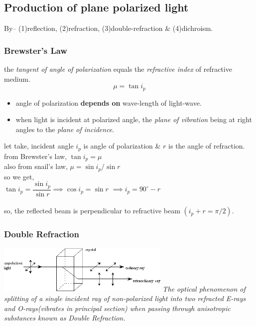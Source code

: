 \documentclass[legalpaper,10pt]{article}
\begin{document}
\begin{multicols*}{2}
	\subsection*{Production of plane polarized light}
	By-- (1)reflection, (2)refraction, (3)double-refraction \&  (4)dichroism.
	\subsubsection*{Brewster's Law}
	the \textit{tangent of angle of polarization} equals the \textit{refractive index} of refractive medium. $$\boxed{ \mu=\tan i_p} $$
	\begin{itemize}
		\item angle of polarization \textbf{depends on} wave-length of light-wave.
		\item when light is incident at polarized angle, the \textit{plane of vibration} being at right angles to the\textit{ plane of incidence}.
	\end{itemize}
	let take, incident angle $ i_p $ is angle of polarization \& $ r $ is the angle of refraction.\\
	from Brewster's law, $ \tan i_p=\mu $\\
	also from snail's law, $ \mu=\sin i_p/\sin r $\\
	\indent so we get,\\
	\hspace*{2cm}$ \tan i_p=\dfrac{\sin i_p}{\sin r} \implies\cos i_p=\sin r$
	\hspace*{5cm}$ \implies i_p=90^\circ-r$\\\\
	\indent so, the reflected beam is perpendicular to refractive beam $ (i_p+r=\pi/2) $.
	
	\subsubsection*{Double Refraction}
	\includegraphics[width=8.3cm]{pol}
	\textit{The optical phenomenon of splitting of a single incident ray of non-polarized light into two refracted E-rays and O-rays(vibrates in principal section) when passing through anisotropic substances known as Double Refraction.}
	

\end{multicols*}
\end{document}
